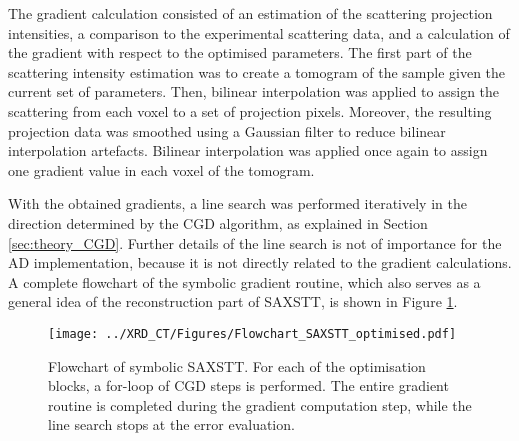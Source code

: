 The gradient calculation consisted of an estimation of the scattering projection intensities, a comparison to the experimental scattering data,
and a calculation of the gradient with respect to the optimised parameters.
The first part of the scattering intensity estimation was to create a tomogram of the sample given the current set of parameters.
Then, bilinear interpolation was applied to assign the scattering from each voxel to a set of projection pixels.
Moreover, the resulting projection data was smoothed using a Gaussian filter to reduce bilinear interpolation artefacts.
Bilinear interpolation was applied once again to assign one gradient value in each voxel of the tomogram. %

With the obtained gradients, a line search was performed iteratively in the direction determined by the CGD algorithm, as explained in Section \ref{sec:theory_CGD}.
Further details of the line search is not of importance for the AD implementation, because it is not directly related to the gradient calculations.
A complete flowchart of the symbolic gradient routine, which also serves as a general idea of the reconstruction part of SAXSTT, is shown in Figure \ref{fig:flowchart_SAXSTT}.



\begin{figure}
    \centering
    \texttt{[image: ../XRD\_CT/Figures/Flowchart\_SAXSTT\_optimised.pdf]} %
    \caption{Flowchart of symbolic SAXSTT.
        For each of the optimisation blocks, a for-loop of CGD steps is performed.
        The entire gradient routine is completed during the gradient computation step, while the line search stops at the error evaluation.
    }
    \label{fig:flowchart_SAXSTT}
\end{figure}

